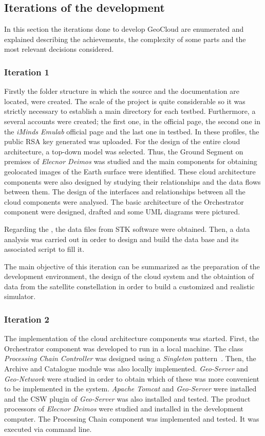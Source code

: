 \subsection{Iterations of the development}

In this section the iterations done to develop GeoCloud are
enumerated and explained describing the achievements, the complexity of some
parts and the most relevant decisions considered.

\subsubsection{Iteration 1}

Firstly the folder structure in which the source and the documentation are
located, were created. The scale of the project is quite considerable so it was
strictly necessary to establish a main directory for each testbed. Furthermore,
a several accounts were created; the first one, in the \bonfire official page,
the second one in the \emph{iMinds Emulab} official page and the last one in \pl
testbed. In these profiles, the
public \ac{RSA} key generated was uploaded.
For the design of the entire cloud architecture, a top-down model was
selected. Thus, the Ground Segment on premises of \emph{Elecnor Deimos} was
studied and the main components for obtaining geolocated images of the Earth
surface were identified. These cloud architecture components were also designed by
studying their relationships and the data flows between them. The design of the
interfaces and relationships between all the cloud components were analysed. 
The basic architecture of the Orchestrator component were
designed, drafted and some \ac{UML} diagrams were pictured. 

Regarding the \sss, the data files from \ac{STK} software were obtained. Then, a data analysis was carried out in order
to design and build the data base and its associated script to fill it.


The main objective of this iteration can be summarized as the preparation
of the development environment, the design of the cloud system and the
obtaintion of data from the satellite constellation in order to build a
customized and realistic simulator.

\subsubsection{Iteration 2}

The implementation of the cloud architecture components was started. First, the
Orchestrator component was developed to run in a local machine. The class
\emph{Processing Chain Controller} was designed using a \emph{Singleton} pattern~\cite{Garcia2013}. Then, the
Archive and Catalogue module was also locally implemented. \emph{Geo-Server} and
\emph{Geo-Network} were studied in order to obtain which of these was more convenient
to be implemented in the system. \emph{Apache Tomcat} and \emph{Geo-Server}
were installed and the \ac{CSW} plugin of \emph{Geo-Server} was also installed
and tested.
The product processors of \emph{Elecnor Deimos} were studied and installed in
the development computer. The Processing Chain component was implemented and
tested. It was executed via command line.

